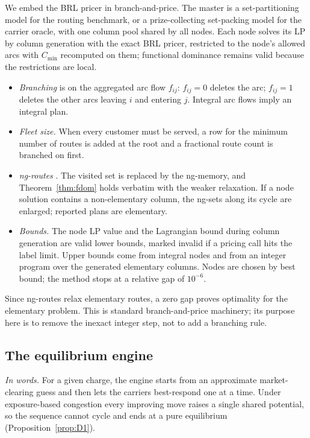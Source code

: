 \documentclass[preprint,12pt]{elsarticle}
\theoremstyle{definition}
\theoremstyle{remark}
\begin{document}
We embed the BRL pricer in branch-and-price. The master is a set-partitioning model for the routing benchmark, or a prize-collecting set-packing model for the carrier oracle, with one column pool shared by all nodes. Each node solves its LP by column generation with the exact BRL pricer, restricted to the node's allowed arcs with $C_{\min}$ recomputed on them; functional dominance remains valid because the restrictions are local.
\begin{itemize}[leftmargin=*]
\item \emph{Branching} is on the aggregated arc flow $f_{ij}$: $f_{ij}=0$ deletes the arc; $f_{ij}=1$ deletes the other arcs leaving $i$ and entering $j$. Integral arc flows imply an integral plan.
\item \emph{Fleet size.} When every customer must be served, a row for the minimum number of routes is added at the root and a fractional route count is branched on first.
\item \emph{ng-routes} \citep{Baldacci2011}. The visited set is replaced by the ng-memory, and Theorem~\ref{thm:fdom} holds verbatim with the weaker relaxation. If a node solution contains a non-elementary column, the ng-sets along its cycle are enlarged; reported plans are elementary.
\item \emph{Bounds.} The node LP value and the Lagrangian bound during column generation are valid lower bounds, marked invalid if a pricing call hits the label limit. Upper bounds come from integral nodes and from an integer program over the generated elementary columns. Nodes are chosen by best bound; the method stops at a relative gap of $10^{-6}$.
\end{itemize}
Since ng-routes relax elementary routes, a zero gap proves optimality for the elementary problem. This is standard branch-and-price machinery; its purpose here is to remove the inexact integer step, not to add a branching rule.

\subsection{The equilibrium engine}\label{sec:engine}

\emph{In words.} For a given charge, the engine starts from an approximate market-clearing guess and then lets the carriers best-respond one at a time. Under exposure-based congestion every improving move raises a single shared potential, so the sequence cannot cycle and ends at a pure equilibrium (Proposition~\ref{prop:D1}).
\end{document}
